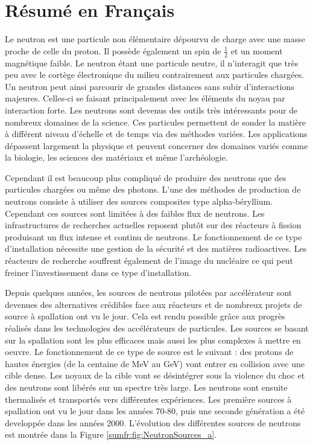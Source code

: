 \chapter*{Résumé en Français}
%

Le neutron est une particule non élémentaire dépourvu de charge avec une masse proche de celle du proton. Il possède également un spin de $\frac{1}{2}$ et un moment magnétique faible. Le neutron étant une particule neutre, il n'interagit que très peu avec le cortège électronique du milieu contrairement aux particules chargées. Un neutron peut ainsi parcourir de grandes distances sans subir d’interactions majeures. Celles-ci se faisant principalement avec les éléments du noyau par interaction forte. Les neutrons sont devenus des outils très intéressants pour de nombreux domaines de la science. Ces particules permettent de sonder la matière à différent niveau d'échelle et de temps via des méthodes variées. Les applications dépassent largement la physique et peuvent concerner des domaines variés comme la biologie, les sciences des matériaux et même l'archéologie.

Cependant il est beaucoup plus compliqué de produire des neutrons que des particules chargées ou même des photons. L'une des méthodes de production de neutrons consiste à utiliser des sources composites type alpha-béryllium. Cependant ces sources sont limitées à des faibles flux de neutrons. Les infrastructures de recherches actuelles reposent plutôt sur des réacteurs à fission produisant un flux intense et continu de neutrons.
Le fonctionnement de ce type d’installation nécessite une gestion de la sécurité et des matières radioactives. Les réacteurs de recherche souffrent également de l’image du nucléaire ce qui peut freiner l’investissement dans ce type d’installation.

Depuis quelques années, les sources de neutrons pilotées par accélérateur sont devenues des alternatives crédibles face aux réacteurs et de nombreux projets de source à spallation ont vu le jour. Cela est rendu possible grâce aux progrès réalisés dans les technologies des accélérateurs de particules. Les sources se basant sur la spallation sont les plus efficaces mais aussi les plus complexes à mettre en oeuvre. Le fonctionnement de ce type de source est le suivant : des protons de hautes énergies (de la centaine de MeV au GeV) vont entrer en collision avec une cible dense. Les noyaux de la cible vont se désintégrer sous la violence du choc et des neutrons sont libérés sur un spectre très large. Les neutrons sont ensuite thermalisés et transportés vers différentes expériences. Les première sources à spallation ont vu le jour dans les années 70-80, puis une seconde génération a été developpée dans les années 2000. L'évolution des différentes sources de neutrons est montrée dans la Figure \ref{sumfr:fig:NeutronSources_a}.


